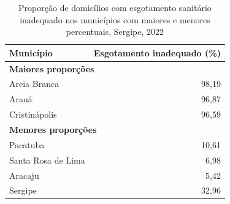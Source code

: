 \begin{table}[H]
\centering
\caption{Proporção de domicílios com esgotamento sanitário inadequado nos municípios com maiores e menores percentuais, Sergipe, 2022}
\label{tab:item2-6-esgoto-inadequado}
\small
\begin{tabular}{lr}
\toprule
Município & Esgotamento inadequado (\%) \\
\midrule
\multicolumn{2}{l}{\textbf{Maiores proporções}} \\
Areia Branca & 98,19 \\
Arauá & 96,87 \\
Cristinápolis & 96,59 \\
\midrule
\multicolumn{2}{l}{\textbf{Menores proporções}} \\
Pacatuba & 10,61 \\
Santa Rosa de Lima & 6,98 \\
Aracaju & 5,42 \\
\midrule
Sergipe & 32,96 \\
\bottomrule
\end{tabular}
\end{table}
